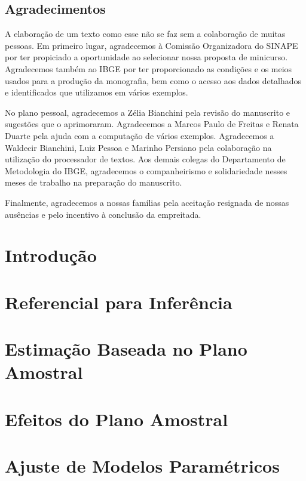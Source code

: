 \documentclass[]{book}
\begin{document}
\section*{Agradecimentos}\label{agradecimentos}

A elaboração de um texto como esse não se faz sem a colaboração de
muitas pessoas. Em primeiro lugar, agradecemos à Comissão Organizadora
do SINAPE por ter propiciado a oportunidade ao selecionar nossa proposta
de minicurso. Agradecemos também ao IBGE por ter proporcionado as
condições e os meios usados para a produção da monografia, bem como o
acesso aos dados detalhados e identificados que utilizamos em vários
exemplos.

No plano pessoal, agradecemos a Zélia Bianchini pela revisão do
manuscrito e sugestões que o aprimoraram. Agradecemos a Marcos Paulo de
Freitas e Renata Duarte pela ajuda com a computação de vários exemplos.
Agradecemos a Waldecir Bianchini, Luiz Pessoa e Marinho Persiano pela
colaboração na utilização do processador de textos. Aos demais colegas
do Departamento de Metodologia do IBGE, agradecemos o companheirismo e
solidariedade nesses meses de trabalho na preparação do manuscrito.

Finalmente, agradecemos a nossas famílias pela aceitação resignada de
nossas ausências e pelo incentivo à conclusão da empreitada.

\chapter{Introdução}\label{introduc}

\chapter{Referencial para Inferência}\label{refinf}

\chapter{Estimação Baseada no Plano Amostral}\label{capplanamo}

\chapter{Efeitos do Plano Amostral}\label{epa}

\chapter{Ajuste de Modelos Paramétricos}\label{ajmodpar}
\end{document}
